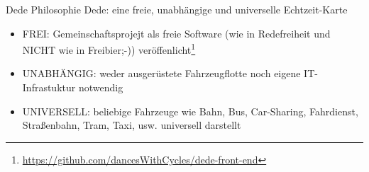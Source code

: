
\begin{frame}{Dede Philosophie}
  Dede: eine freie, unabhängige und universelle Echtzeit-Karte
  \begin{itemize}
  \item FREI: Gemeinschaftsprojejt als freie Software (wie in Redefreiheit und NICHT wie in Freibier;-)) veröffenlicht\footnote{\url{https://github.com/dancesWithCycles/dede-front-end}}
  \item UNABHÄNGIG: weder ausgerüstete Fahrzeugflotte noch eigene IT-Infrastuktur notwendig
  \item UNIVERSELL: beliebige Fahrzeuge wie Bahn, Bus, Car-Sharing, Fahrdienst, Straßenbahn, Tram, Taxi, usw. universell darstellt
  \end{itemize}
\end{frame}
